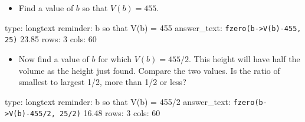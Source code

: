 \documentclass[12pt]{article}
\begin{document}
\begin{itemize}
\itemsep1pt\parskip0pt
\item
  Find a value of $b$ so that $V(b) = 455$.
\end{itemize}

\begin{answer}
type: longtext
reminder: b so that V(b) = 455
answer_text: \verb#fzero(b->V(b)-455, 25)# 23.85 
rows: 3
cols: 60
\end{answer}

\begin{itemize}
\itemsep1pt\parskip0pt
\item
  Now find a value of $b$ for which $V(b) = 455/2$. This height will
  have half the volume as the height just found. Compare the two values.
  Is the ratio of smallest to largest 1/2, more than 1/2 or less?
\end{itemize}

\begin{answer}
type: longtext
reminder: b so that V(b) = 455/2
answer_text: \verb#fzero(b->V(b)-455/2, 25/2)# 16.48 
rows: 3
cols: 60
\end{answer}
\end{document}
